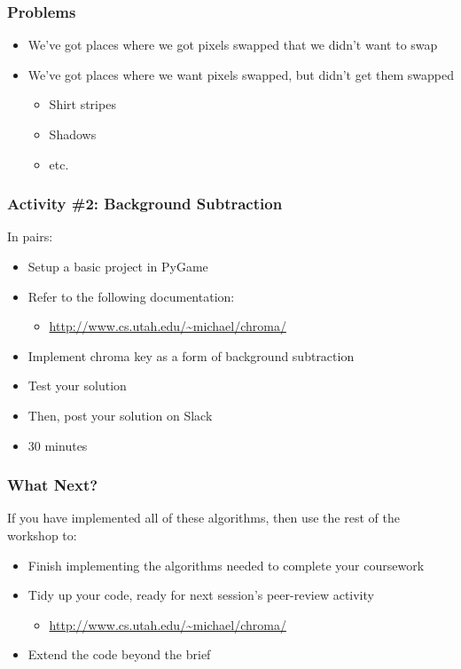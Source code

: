 

\begin{frame}
	\frametitle{Problems}
	
	\begin{itemize}		
		\item We've got places where we got pixels swapped that we didn't want to swap
		\item We've got places where we want pixels swapped, but didn't get them swapped
		\begin{itemize}
			\item Shirt stripes
			\item Shadows
			\item etc.
		\end{itemize}	
	\end{itemize}
\end{frame}

\begin{frame}
	\frametitle{Activity \#2: Background Subtraction}
	
	In pairs:
	
	\vspace{2em}
	
	\begin{itemize}		
		\item Setup a basic project in PyGame
		\item Refer to the following documentation:
		\begin{itemize}
			\item \url{http://www.cs.utah.edu/~michael/chroma/}
		\end{itemize}
		\item Implement chroma key as a form of background subtraction
		\item Test your solution
		\item Then, post your solution on Slack
		\item 30 minutes
	\end{itemize}
\end{frame}

\begin{frame}
	\frametitle{What Next?}
	
	If you have implemented all of these algorithms, then use the rest of the workshop to:
	
	\vspace{2em}
	
	\begin{itemize}		
		\item Finish implementing the algorithms needed to complete your coursework
		\item Tidy up your code, ready for next session's peer-review activity
		\begin{itemize}
			\item \url{http://www.cs.utah.edu/~michael/chroma/}
		\end{itemize}
		\item Extend the code beyond the brief
	\end{itemize}
\end{frame}